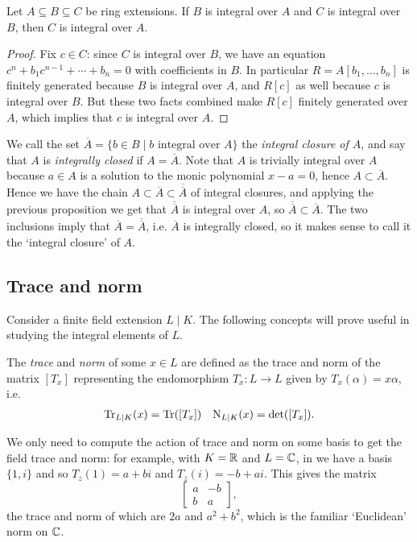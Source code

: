 \begin{prop}
	Let $A\subseteq B\subseteq C$ be ring extensions. If $B$ is integral over $A$ and $C$ is integral over $B$, then $C$ is integral over $A$.
\end{prop}
\begin{proof}
	Fix $c\in C$: since $C$ is integral over $B$, we have an equation $c^n+b_1c^{n-1}+\cdots+b_n=0$ with coefficients in $B$. In particular $R=A[b_1,\dots,b_n]$ is finitely generated because $B$ is integral over $A$, and $R[c]$ as well because $c$ is integral over $B$. But these two facts combined make $R[c]$ finitely generated over $A$, which implies that $c$ is integral over $A$.
\end{proof}

We call the set $\overline{A}=\{b\in B \mid b \text{ integral over } A\}$ the \emph{integral closure of $A$}, and say that $A$ is \emph{integrally closed} if $A=\overline{A}$. Note that $A$ is trivially integral over $A$ because $a\in A$ is a solution to the monic polynomial $x-a=0$, hence $A\subset\overline{A}$. Hence we have the chain $A\subset \overline{A}\subset\overline{\overline{A}}$ of integral closures, and applying the previous proposition we get that $\overline{\overline{A}}$ is integral over $A$, so $\overline{\overline{A}}\subset\overline{A}$. The two inclusions imply that $\overline{A}=\overline{\overline{A}}$, i.e. $\overline{A}$ is integrally closed, so it makes sense to call it the `integral closure' of $A$.


\subsection{Trace and norm}

Consider a finite field extension $L\mid K$. The following concepts will prove useful in studying the integral elements of $L$.

\begin{defn}
	The \emph{trace} and \emph{norm} of some $x\in L$ are defined as the trace and norm of the matrix $[T_x]$ representing the endomorphism $T_x:L\to L$ given by $T_x(\alpha)=x\alpha$, i.e.
	\begin{align*}
		\operatorname{Tr}_{L\mid K}(x) = \operatorname{Tr}([T_x]) & & \operatorname{N}_{L\mid K}(x) = \det([T_x]).
	\end{align*}
\end{defn}

We only need to compute the action of trace and norm on some basis to get the field trace and norm: for example, with $K=\mathbb{R}$ and $L=\mathbb{C}$, in we have a basis $\{1,i\}$ and so $T_z(1)=a+bi$ and $T_z(i)=-b+ai$. This gives the matrix
\[
	\begin{bmatrix}
		a & -b\\
		b & a
	\end{bmatrix},
\]
the trace and norm of which are $2a$ and $a^2+b^2$, which is the familiar `Euclidean' norm on $\mathbb{C}$.


